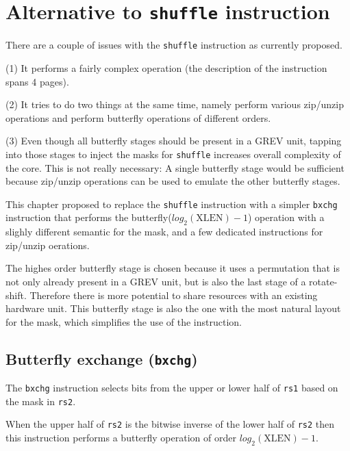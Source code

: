 \chapter{Alternative to \texttt{shuffle} instruction}

There are a couple of issues with the {\tt shuffle} instruction as currently proposed.

(1) It performs a fairly complex operation (the description of the instruction
spans 4 pages).

(2) It tries to do two things at the same time, namely perform various zip/unzip
operations and perform butterfly operations of different orders.

(3) Even though all butterfly stages should be present in a GREV unit, tapping into
those stages to inject the masks for {\tt shuffle} increases overall complexity of
the core. This is not really necessary: A single butterfly stage would be sufficient
because zip/unzip operations can be used to emulate the other butterfly stages.

This chapter proposed to replace the {\tt shuffle} instruction with a simpler \texttt{bxchg}
instruction that performs the butterfly($log_2(\textrm{XLEN})-1$) operation with a
slighly different semantic for the mask, and a few dedicated instructions for zip/unzip
oerations.

The highes order butterfly stage is chosen because it uses a permutation that is not only
already present in a GREV unit, but is also the last stage of a rotate-shift.
Therefore there is more potential to share resources with an existing hardware
unit. This butterfly stage is also the one with the most natural layout for
the mask, which simplifies the use of the instruction.


\section{Butterfly exchange (\texttt{bxchg})}

The {\tt bxchg} instruction selects bits from the upper or lower half of {\tt rs1}
based on the mask in {\tt rs2}.



When the upper half of {\tt rs2} is the bitwise inverse of the lower half of
{\tt rs2} then this instruction performs a butterfly operation of order
$log_2(\textrm{XLEN})-1$.

